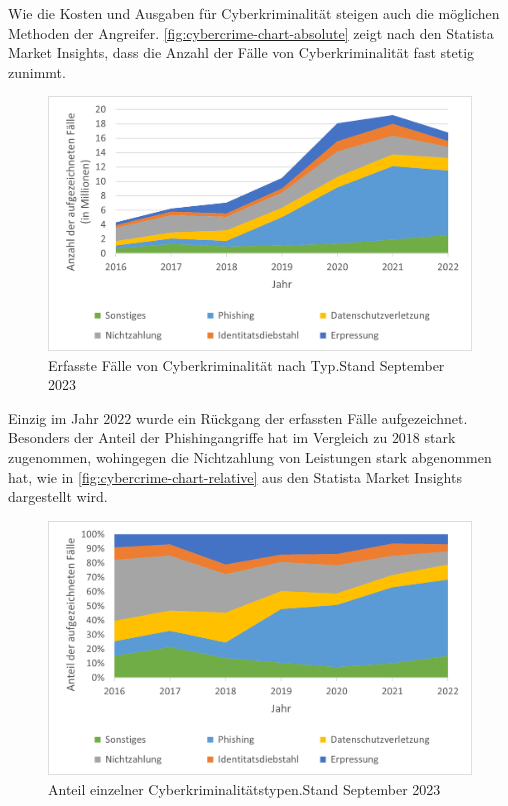 Wie die Kosten und Ausgaben für Cyberkriminalität steigen auch die möglichen Methoden der Angreifer.
\autoref{fig:cybercrime-chart-absolute} zeigt nach den Statista Market Insights\autocite[\vglf][]{statista-cybersecurity-cybercrime}, dass die Anzahl der Fälle von Cyberkriminalität fast stetig zunimmt.

\begin{figure}[htpb]
    \centering
    \includegraphics[width = 0.75\linewidth, trim = {0.55cm 0.3cm 0.4cm 0.25cm}, clip]{src/abbildungen/Aufgezeichnete_Cyberkriminalitaet}
    \captionsetup{width=\linewidth, format=hang}
    \caption[Erfasste Fälle von Cyberkriminalität nach Typ]{Erfasste Fälle von Cyberkriminalität nach Typ.\newline Stand September 2023}
    \label{fig:cybercrime-chart-absolute}
\end{figure}

Einzig im Jahr $2022$ wurde ein Rückgang der erfassten Fälle aufgezeichnet.
Besonders der Anteil der Phishingangriffe hat im Vergleich zu $2018$ stark zugenommen, wohingegen die Nichtzahlung von Leistungen stark abgenommen hat, wie in \autoref{fig:cybercrime-chart-relative} aus den Statista Market Insights\autocite[\vglf][]{statista-cybersecurity-cybercrime} dargestellt wird.

\begin{figure}[htpb]
    \centering
    \includegraphics[width = 0.75\linewidth, trim = {0.55cm 0.3cm 0.4cm 0.25cm}, clip]{src/abbildungen/Anteile_Cyberkriminalitaet}
    \captionsetup{width=\linewidth, format=hang}
    \caption[Anteil einzelner Cyberkriminalitätstypen]{Anteil einzelner Cyberkriminalitätstypen.\newline Stand September 2023}
    \label{fig:cybercrime-chart-relative}
\end{figure}

